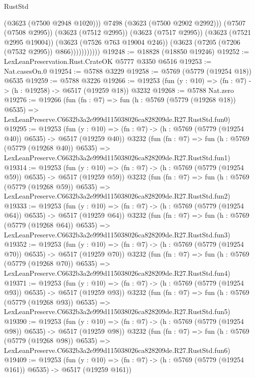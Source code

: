 \begin{lexlean}{RustStd}
\begin{coremodule}
                          (@3623 (@7500 @2948 @1020)))
                        @7498
                        (@3623 (@7500 @2902 @2992)))
                      (@7507 (@7508 @2995))
                      (@3623 (@7512 @2995))
                      (@3623 (@7517 @2995))
                      (@3623 (@7521 @2995 @19004))
                      (@3623 (@7526 @763 @19004 @246))
                      (@3623 (@7205 (@7206 (@7532 @2995)) @866)))))))))))
@19248 := @18828 (@18850 @19246)
@19252 := LexLeanPreservation.Rust.CrateOK @5777 @3350 @6516
@19253 := Nat.casesOn.{0}
@19254 := @5788 @3229
@19258 := @5769 (@5779 (@19254 @18)) @6535
@19259 := @5788 @3226
@19266 := @19253 (fun (y : @10) => (fn : @7) -> (h : @19258) -> @6517 (@19259 @18)) @3232
@19268 := @5788 Nat.zero
@19276 := @19266
    (fun (fn : @7) =>
    fun (h : @5769 (@5779 (@19268 @18)) @6535) =>
    LexLeanPreserve.C6632b3a2e999d115038026ca828209de.R27.RustStd.fun0)
@19295 := @19253
    (fun (y : @10) => (fn : @7) -> (h : @5769 (@5779 (@19254 @40)) @6535) -> @6517 (@19259 @40))
    @3232
    (fun (fn : @7) =>
    fun (h : @5769 (@5779 (@19268 @40)) @6535) =>
    LexLeanPreserve.C6632b3a2e999d115038026ca828209de.R27.RustStd.fun1)
@19314 := @19253
    (fun (y : @10) => (fn : @7) -> (h : @5769 (@5779 (@19254 @59)) @6535) -> @6517 (@19259 @59))
    @3232
    (fun (fn : @7) =>
    fun (h : @5769 (@5779 (@19268 @59)) @6535) =>
    LexLeanPreserve.C6632b3a2e999d115038026ca828209de.R27.RustStd.fun2)
@19333 := @19253
    (fun (y : @10) => (fn : @7) -> (h : @5769 (@5779 (@19254 @64)) @6535) -> @6517 (@19259 @64))
    @3232
    (fun (fn : @7) =>
    fun (h : @5769 (@5779 (@19268 @64)) @6535) =>
    LexLeanPreserve.C6632b3a2e999d115038026ca828209de.R27.RustStd.fun3)
@19352 := @19253
    (fun (y : @10) => (fn : @7) -> (h : @5769 (@5779 (@19254 @70)) @6535) -> @6517 (@19259 @70))
    @3232
    (fun (fn : @7) =>
    fun (h : @5769 (@5779 (@19268 @70)) @6535) =>
    LexLeanPreserve.C6632b3a2e999d115038026ca828209de.R27.RustStd.fun4)
@19371 := @19253
    (fun (y : @10) => (fn : @7) -> (h : @5769 (@5779 (@19254 @93)) @6535) -> @6517 (@19259 @93))
    @3232
    (fun (fn : @7) =>
    fun (h : @5769 (@5779 (@19268 @93)) @6535) =>
    LexLeanPreserve.C6632b3a2e999d115038026ca828209de.R27.RustStd.fun5)
@19390 := @19253
    (fun (y : @10) => (fn : @7) -> (h : @5769 (@5779 (@19254 @98)) @6535) -> @6517 (@19259 @98))
    @3232
    (fun (fn : @7) =>
    fun (h : @5769 (@5779 (@19268 @98)) @6535) =>
    LexLeanPreserve.C6632b3a2e999d115038026ca828209de.R27.RustStd.fun6)
@19409 := @19253
    (fun (y : @10) => (fn : @7) -> (h : @5769 (@5779 (@19254 @161)) @6535) -> @6517 (@19259 @161))

\end{coremodule}
\end{lexlean}
